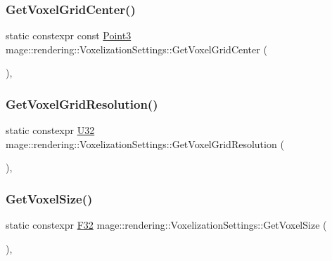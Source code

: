 \subsubsection{\texorpdfstring{Get\+Voxel\+Grid\+Center()}{GetVoxelGridCenter()}}
{\footnotesize\ttfamily static constexpr const \mbox{\hyperlink{structmage_1_1_point3}{Point3}} mage\+::rendering\+::\+Voxelization\+Settings\+::\+Get\+Voxel\+Grid\+Center (\begin{DoxyParamCaption}{ }\end{DoxyParamCaption})\hspace{0.3cm}{\ttfamily [static]}, {\ttfamily [noexcept]}}

\mbox{\label{classmage_1_1rendering_1_1_voxelization_settings_a0a940986058f36311aea31331cb18c14}} 
\subsubsection{\texorpdfstring{Get\+Voxel\+Grid\+Resolution()}{GetVoxelGridResolution()}}
{\footnotesize\ttfamily static constexpr \mbox{\hyperlink{namespacemage_a41c104c036fba3756a74e19f793eeaa1}{U32}} mage\+::rendering\+::\+Voxelization\+Settings\+::\+Get\+Voxel\+Grid\+Resolution (\begin{DoxyParamCaption}{ }\end{DoxyParamCaption})\hspace{0.3cm}{\ttfamily [static]}, {\ttfamily [noexcept]}}

\mbox{\label{classmage_1_1rendering_1_1_voxelization_settings_a510d2c8d3d5ebcb88617a0e717f64723}} 
\subsubsection{\texorpdfstring{Get\+Voxel\+Size()}{GetVoxelSize()}}
{\footnotesize\ttfamily static constexpr \mbox{\hyperlink{namespacemage_aa97e833b45f06d60a0a9c4fc22ae02c0}{F32}} mage\+::rendering\+::\+Voxelization\+Settings\+::\+Get\+Voxel\+Size (\begin{DoxyParamCaption}{ }\end{DoxyParamCaption})\hspace{0.3cm}{\ttfamily [static]}, {\ttfamily [noexcept]}}

